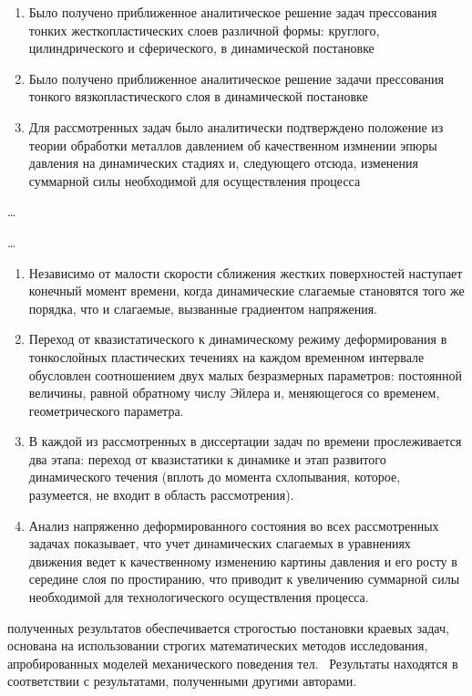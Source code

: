{\novelty}
\begin{enumerate}[beginpenalty=10000] %
    \item Было получено приближенное аналитическое решение задач прессования тонких жесткопластических слоев различной формы: круглого, цилиндрического и сферического, в динамической постановке
    \item Было получено приближенное аналитическое решение задачи прессования тонкого вязкопластического слоя в динамической постановке
    \item Для рассмотренных задач было аналитически подтверждено положение из теории обработки металлов давлением об качественном измнении эпюры давления  на динамических стадиях и, следующего отсюда, изменения суммарной силы необходимой для осуществления процесса
\end{enumerate}

{\influence} \ldots

{\methods} \ldots

{}
\begin{enumerate}[beginpenalty=10000] %
    \item Независимо от малости скорости сближения жестких поверхностей наступает конечный момент времени, когда динамические слагаемые становятся того же порядка, что и слагаемые, вызванные градиентом напряжения.
    \item Переход от квазистатического к динамическому режиму деформирования в тонкослойных пластических течениях на каждом временном интервале обусловлен соотношением двух малых безразмерных параметров: постоянной величины, равной обратному числу Эйлера и, меняющегося со временем, геометрического параметра.
    \item В каждой из рассмотренных в диссертации задач по времени прослеживается два этапа: переход от квазистатики к динамике и этап развитого динамического течения (вплоть до момента схлопывания, которое, разумеется, не входит в область рассмотрения).
    \item Анализ напряженно деформированного состояния во всех рассмотренных задачах показывает, что учет динамических слагаемых в уравнениях движения ведет к качественному изменению картины давления и его росту в середине слоя по простиранию, что приводит к увеличению суммарной силы необходимой для технологического осуществления процесса.
\end{enumerate}

{\reliability} полученных результатов обеспечивается строгостью постановки краевых задач, основана на использовании строгих математических методов исследования, апробированных моделей механического поведения тел. \ Результаты находятся в соответствии с результатами, полученными другими авторами.


